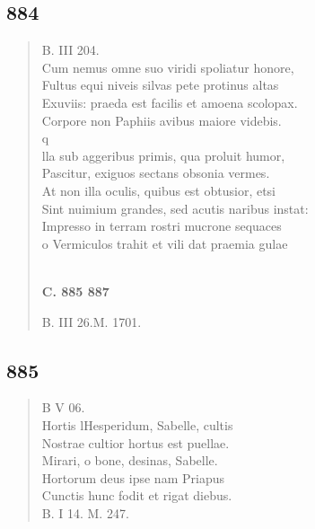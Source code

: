 \documentclass[11pt, a4paper]{report}
\begin{document}
            \subsection*{884}
      \begin{verse}
      B. III 204. \\ Cum nemus omne suo viridi spoliatur honore, \\ Fultus equi niveis silvas pete protinus altas \\ Exuviis: praeda est facilis et amoena scolopax. \\ Corpore non Paphiis avibus maiore videbis. \\ q \\ lla sub aggeribus primis, qua proluit humor, \\ Pascitur, exiguos sectans obsonia vermes. \\ At non illa oculis, quibus est obtusior, etsi \\ Sint nuimium grandes, sed acutis naribus instat: \\ Impresso in terram rostri mucrone sequaces \\ o Vermiculos trahit et vili dat praemia gulae \\ 
        ﻿\pagebreak 
    \begin{center} \textbf{C. 885 887} \end{center} \marginpar{[332]} B. III 26.M. 1701. \\ 
      \end{verse}
  
            \subsection*{885}
      \begin{verse}
      B V 06. \\ Hortis lHesperidum, Sabelle, cultis \\ Nostrae cultior hortus est puellae. \\ Mirari, o bone, desinas, Sabelle. \\ Hortorum deus ipse nam Priapus \\ Cunctis hunc fodit et rigat diebus. \\ B. I 14. M. 247. \\ 
      \end{verse}
  
\end{document}
